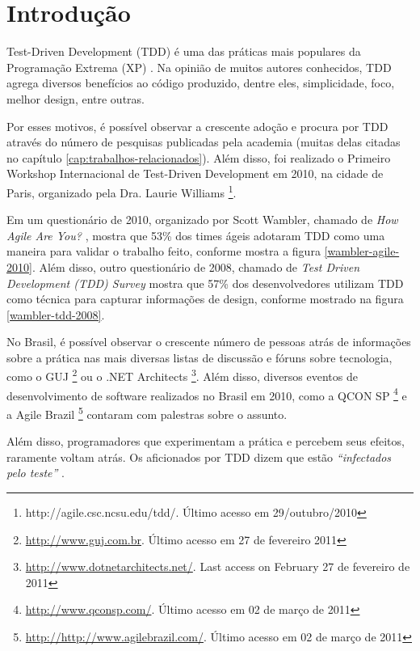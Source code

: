 \chapter{Introdução}
\label{cap:introducao}

Test-Driven Development (TDD) é uma das práticas mais populares da Programação
Extrema (XP) \cite{XPExplained}. 
Na opinião de muitos autores conhecidos, TDD agrega diversos benefícios ao
código produzido, dentre eles, simplicidade, foco, melhor design, entre outras.

Por esses motivos, é possível observar a crescente adoção e procura por TDD
através do número de pesquisas publicadas pela academia (muitas delas citadas no
capítulo \ref{cap:trabalhos-relacionados}). Além disso, foi realizado o Primeiro
Workshop Internacional de Test-Driven Development em 2010, na cidade de Paris, 
organizado pela Dra. Laurie Williams \footnote{http://agile.csc.ncsu.edu/tdd/. 
Último acesso em 29/outubro/2010}.

Em um questionário de 2010, organizado por Scott Wambler, chamado de \textit{How
Agile Are You?} \cite{wambler-survey-agile}, mostra que 53\% dos times ágeis
adotaram TDD como uma maneira para validar o trabalho feito, conforme mostra a 
figura \ref{wambler-agile-2010}. Além disso, outro questionário de 2008, 
chamado de \textit{Test Driven Development (TDD) Survey}
\cite{wambler-survey-tdd}  mostra que 57\% dos desenvolvedores utilizam TDD como
técnica para capturar informações de design, conforme mostrado na figura 
\ref{wambler-tdd-2008}. 

No Brasil, é possível observar o crescente número de pessoas atrás de
informações sobre a prática nas mais diversas listas de discussão e fóruns sobre
tecnologia, como o GUJ \footnote{\url{http://www.guj.com.br}.
Último acesso em 27 de fevereiro 2011} ou o .NET Architects 
\footnote{\url{http://www.dotnetarchitects.net/}. Last access on February
27 de fevereiro de 2011}. Além disso, diversos eventos de desenvolvimento de
software realizados no Brasil em 2010, como a QCON SP
\footnote{\url{http://www.qconsp.com/}. Último acesso em 02 de março de 2011} e
a Agile Brazil \footnote{\url{http://http://www.agilebrazil.com/}. Último acesso
em 02 de março de 2011} contaram com palestras sobre o assunto.

Além disso, programadores que experimentam a prática e percebem seus
efeitos, raramente voltam atrás. Os aficionados por TDD dizem que estão
\textit{``infectados pelo teste''} \cite{tdd-fearless}.

